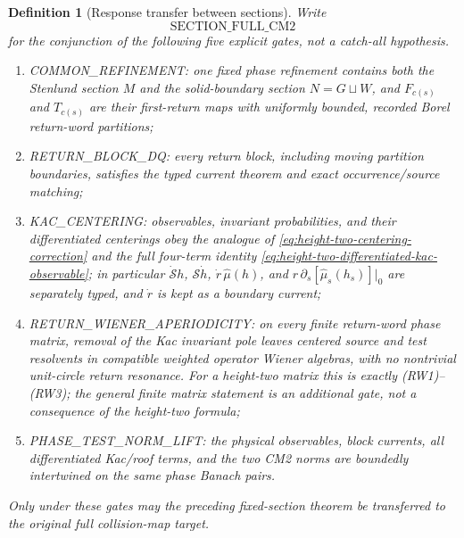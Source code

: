 \documentclass[11pt]{article}
\newtheorem{definition}[theorem]{Definition}
\begin{document}
\begin{definition}[Response transfer between sections]
\label{def:section-full-response-transfer}
Write
\[
 \mathrm{SECTION\_FULL\_CM2}
\]
for the conjunction of the following five explicit gates, not a catch-all
hypothesis.
\begin{enumerate}[label=\textup{(SF\arabic*)}]
\item \textup{COMMON\_REFINEMENT}: one fixed phase refinement contains both
the Stenlund section $M$ and the solid-boundary section $N=G\sqcup W$, and
$F_{c(s)}$ and $T_{c(s)}$ are their first-return maps with uniformly bounded,
recorded Borel return-word partitions;
\item \textup{RETURN\_BLOCK\_DQ}: every return block, including moving
partition boundaries, satisfies the typed current theorem and exact
occurrence/source matching;
\item \textup{KAC\_CENTERING}: observables, invariant probabilities, and
their differentiated centerings obey the analogue of
\eqref{eq:height-two-centering-correction} and the full four-term identity
\eqref{eq:height-two-differentiated-kac-observable}; in particular
$\dot{\mathcal S}h$, $\mathcal S\dot h$, $\dot r\,\widehat\mu(h)$, and
$r\,\partial_s[\widehat\mu_s(h_s)]|_0$ are separately typed, and $\dot r$
is kept as a boundary current;
\item \textup{RETURN\_WIENER\_APERIODICITY}: on every finite return-word
phase matrix, removal of the Kac invariant pole leaves centered source and
test resolvents in compatible weighted operator Wiener algebras, with no
nontrivial unit-circle return resonance.  For a height-two matrix this is
exactly \textup{(RW1)--(RW3)}; the general finite matrix statement is an
additional gate, not a consequence of the height-two formula;
\item \textup{PHASE\_TEST\_NORM\_LIFT}: the physical observables, block
currents, all differentiated Kac/roof terms, and the two CM2 norms are
boundedly intertwined on the same phase Banach pairs.
\end{enumerate}
Only under these gates may the preceding fixed-section theorem be transferred
to the original full collision-map target.
\end{definition}
\end{document}
